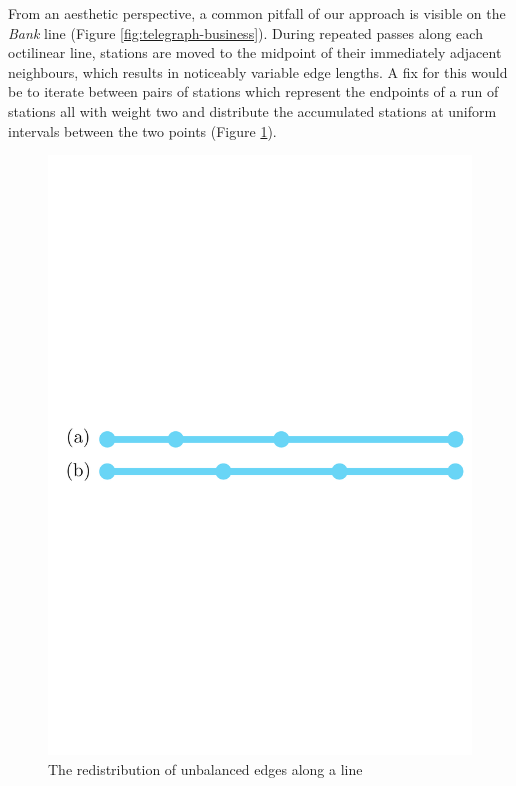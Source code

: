 From an aesthetic perspective, a common pitfall of our approach is visible on the \textit{Bank} line (Figure \ref{fig:telegraph-business}). During repeated passes along each octilinear line, stations are moved to the midpoint of their immediately adjacent neighbours, which results in noticeably variable edge lengths. A fix for this would be to iterate between pairs of stations which represent the endpoints of a run of stations all with weight two and distribute the accumulated stations at uniform intervals between the two points (Figure \ref{fig:equal-spacing}).
\begin{figure}[htbp!]
	\centering
	\includegraphics[width=.5\textwidth]{img/results/equal-spacing.pdf}
	\caption{The redistribution of unbalanced edges along a line}
	\label{fig:equal-spacing}
\end{figure}

